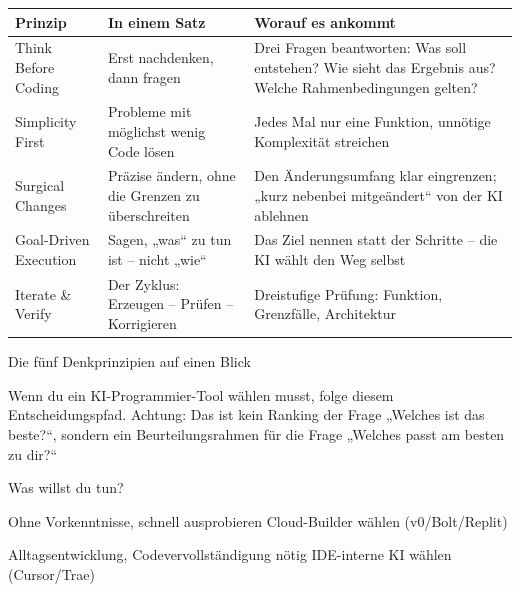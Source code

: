 


\begin{center}
\begin{tabularx}{\linewidth}{|X|X|X|}
\hline
\textbf{Prinzip} & \textbf{In einem Satz} & \textbf{Worauf es ankommt} \tabularnewline
\hline
Think Before Coding & Erst nachdenken, dann fragen & Drei Fragen beantworten: Was soll entstehen? Wie sieht das Ergebnis aus? Welche Rahmenbedingungen gelten? \tabularnewline
Simplicity First & Probleme mit möglichst wenig Code lösen & Jedes Mal nur eine Funktion, unnötige Komplexität streichen \tabularnewline
Surgical Changes & Präzise ändern, ohne die Grenzen zu überschreiten & Den Änderungsumfang klar eingrenzen; „kurz nebenbei mitgeändert“ von der KI ablehnen \tabularnewline
Goal-Driven Execution & Sagen, „was“ zu tun ist – nicht „wie“ & Das Ziel nennen statt der Schritte – die KI wählt den Weg selbst \tabularnewline
Iterate \& Verify & Der Zyklus: Erzeugen – Prüfen – Korrigieren & Dreistufige Prüfung: Funktion, Grenzfälle, Architektur \tabularnewline
\hline
\end{tabularx}
\end{center}

\begin{center}\small\color{gray}Die fünf Denkprinzipien auf einen Blick\end{center}


Wenn du ein KI-Programmier-Tool wählen musst, folge diesem Entscheidungspfad. Achtung: Das ist kein Ranking der Frage „Welches ist das beste?“, sondern ein Beurteilungsrahmen für die Frage „Welches passt am besten zu dir?“

Was willst du tun?

Ohne Vorkenntnisse, schnell ausprobieren Cloud-Builder wählen (v0/Bolt/Replit)

Alltagsentwicklung, Codevervollständigung nötig IDE-interne KI wählen (Cursor/Trae)

